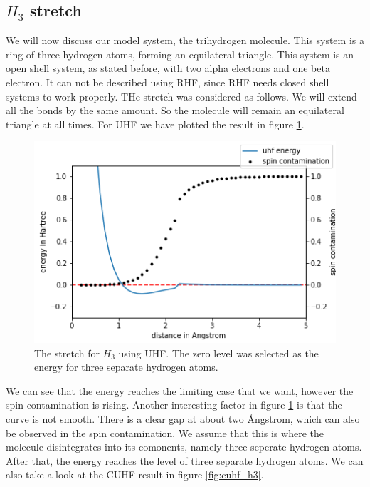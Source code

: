 \documentclass[twoside,twocolumn,9pt]{article}
\begin{document}
\subsection{$H_3$ stretch}
\label{subsec:h3}
We will now discuss our model system, the trihydrogen molecule. This system is a ring of three hydrogen atoms, forming an equilateral triangle.
This system is an open shell system, as stated before, with two alpha electrons and one beta electron. It can not be described using RHF, since RHF needs closed shell systems to work properly.
THe stretch was considered as follows. We will extend all the bonds by the same amount. So the molecule will remain an equilateral triangle at all times. For UHF we have plotted
the result in figure \ref{fig:uhf_h3}.
\begin{center}
  \begin{figure}[h]
    \includegraphics[width=\linewidth]{./../notes/figures/uhf_h3.png}
    \caption{The stretch for $H_3$ using UHF. The zero level was selected as the energy for three separate hydrogen atoms.}
    \label{fig:uhf_h3}
  \end{figure}
\end{center}
We can see that the energy reaches the limiting case that we want, however the spin contamination is rising. Another interesting factor in figure \ref{fig:uhf_h3} is that the curve 
is not smooth. There is a clear gap at about two \si{\angstrom}ngstrom, which can also be observed in the spin contamination. We assume that this is where the molecule disintegrates
into its comonents, namely three seperate hydrogen atoms. After that, the energy reaches the level of three separate hydrogen atoms. We can also take a look at the CUHF result in
figure \ref{fig:cuhf_h3}.
\end{document}

